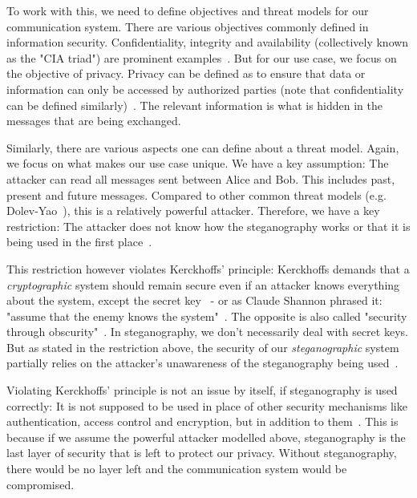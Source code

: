 To work with this, we need to define objectives and threat models for our communication system. There are various objectives commonly defined in information security. Confidentiality, integrity and availability (collectively known as the "CIA triad") are prominent examples~\cite{aliIoTSecurityReview2019,qadirReviewPaperCryptography2019,chowdhuryChatGPTThreatCIA2023}. But for our use case, we focus on the objective of privacy. Privacy can be defined as to ensure that data or information can only be accessed by authorized parties (note that confidentiality can be defined similarly)~\cite{chowdhuryChatGPTThreatCIA2023}. The relevant information is what is hidden in the messages that are being exchanged.

Similarly, there are various aspects one can define about a threat model. Again, we focus on what makes our use case unique. We have a key assumption: The attacker can read all messages sent between Alice and Bob. This includes past, present and future messages. Compared to other common threat models (e.g. Dolev-Yao~\cite{dolevSecurityPublicKey1983}), this is a relatively powerful attacker. Therefore, we have a key restriction: The attacker does not know how the steganography works or that it is being used in the first place~\cite{al-aniOverviewMainFundamentals2010}.

This restriction however violates Kerckhoffs' principle: Kerckhoffs demands that a \textit{cryptographic} system should remain secure even if an attacker knows everything about the system, except the secret key~\cite{andersonLimitsSteganography1998,smithEffectiveSecurityObscurity2022} - or as Claude Shannon phrased it: "assume that the enemy knows the system"~\cite{shannonCommunicationTheorySecrecy1949}. The opposite is also called "security through obscurity"~\cite{smithEffectiveSecurityObscurity2022}. In steganography, we don't necessarily deal with secret keys. But as stated in the restriction above, the security of our \textit{steganographic} system partially relies on the attacker's unawareness of the steganography being used~\cite{al-aniOverviewMainFundamentals2010}.

Violating Kerckhoffs' principle is not an issue by itself, if steganography is used correctly: It is not supposed to be used in place of other security mechanisms like authentication, access control and encryption, but in addition to them~\cite{al-aniOverviewMainFundamentals2010}. This is because if we assume the powerful attacker modelled above, steganography is the last layer of security that is left to protect our privacy. Without steganography, there would be no layer left and the communication system would be compromised.

